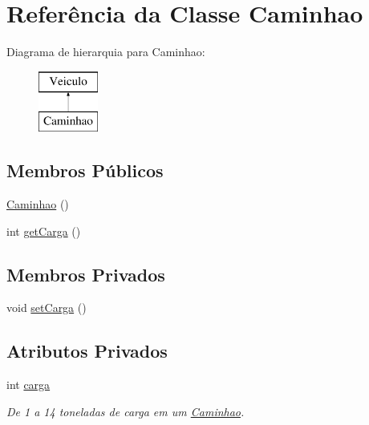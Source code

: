 \hypertarget{class_caminhao}{}\section{Referência da Classe Caminhao}
\label{class_caminhao}
Diagrama de hierarquia para Caminhao\+:\begin{figure}[H]
\begin{center}
\leavevmode
\includegraphics[height=2.000000cm]{class_caminhao}
\end{center}
\end{figure}
\subsection*{Membros Públicos}
\begin{DoxyCompactItemize}
\item 
\mbox{\hyperlink{class_caminhao_af533c39b3db0b14e7c404d4d91a88e47}{Caminhao}} ()
\item 
int \mbox{\hyperlink{class_caminhao_a72a337da0709d0d44385f9a3adc94848}{get\+Carga}} ()
\end{DoxyCompactItemize}
\subsection*{Membros Privados}
\begin{DoxyCompactItemize}
\item 
void \mbox{\hyperlink{class_caminhao_ab8cceb70d87e28684af27ee303804001}{set\+Carga}} ()
\end{DoxyCompactItemize}
\subsection*{Atributos Privados}
\begin{DoxyCompactItemize}
\item 
\mbox{\label{class_caminhao_a145576b7d09b5bc02ed6d1328b95e6b9}} 
int \mbox{\hyperlink{class_caminhao_a145576b7d09b5bc02ed6d1328b95e6b9}{carga}}
\begin{DoxyCompactList}\small\item\em De 1 a 14 toneladas de carga em um \mbox{\hyperlink{class_caminhao}{Caminhao}}. \end{DoxyCompactList}\end{DoxyCompactItemize}
